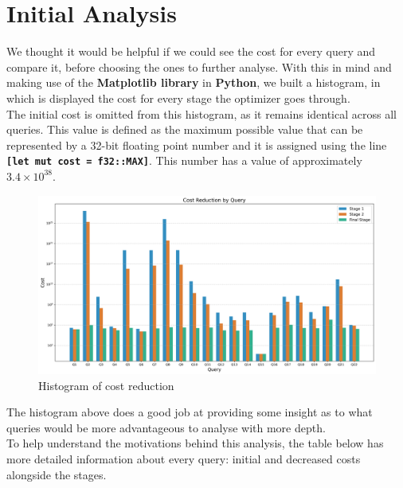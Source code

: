 \documentclass[a4paper,12pt]{scrreprt}
\begin{document}
\section{Initial Analysis}
We thought it would be helpful if we could see the cost for every query and compare it, before choosing the ones to further analyse. With this in mind and making use of the \textbf{Matplotlib library} in \textbf{Python}, we built a histogram, in which is displayed the cost for every stage the optimizer goes through. \\

The initial cost is omitted from this histogram, as it remains identical across all queries.
This value is defined as the maximum possible value that can be represented by a 32-bit floating point number and it is assigned using the line \textbf{\texttt{[let mut cost = f32::MAX]}}. This number has a value of approximately $3.4 \times 10^{38}$.

\begin{figure}[H]
    \includegraphics[width = 1.35\textwidth, height = 0.37\textheight, keepaspectratio]{img_cost_differential/cost_reduction_all_queries.png}
    \caption{Histogram of cost reduction}
    \label{fig:cost1}
\end{figure}

The histogram above does a good job at providing some insight as to what queries would be more advantageous to analyse with more depth. \\

To help understand the motivations behind this analysis, the table below has more detailed information about every query: initial and decreased costs alongside the stages.
\end{document}
